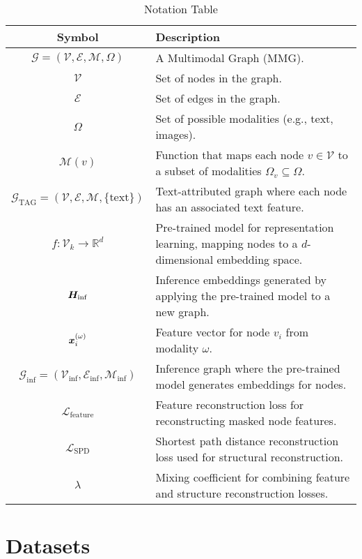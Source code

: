 \begin{table*}[t]
\centering
\caption{Notation Table}
\begin{tabular}{cl}
\toprule[1.1pt]
\textbf{Symbol} & \textbf{Description} \\ 
\midrule
$\mathcal{G} = (\mathcal{V}, \mathcal{E}, \mathcal{M}, \Omega)$ & A Multimodal Graph (MMG). \\ 
$\mathcal{V}$ & Set of nodes in the graph. \\ 
$\mathcal{E}$ & Set of edges in the graph. \\
$\Omega$ & Set of possible modalities (e.g., text, images). \\ 
$\mathcal{M}(v)$ & Function that maps each node $v \in \mathcal{V}$ to a subset of modalities $\Omega_v \subseteq \Omega$. \\ 
$\mathcal{G}_{\text{TAG}} = (\mathcal{V}, \mathcal{E}, \mathcal{M}, \{\text{text}\})$ & Text-attributed graph where each node has an associated text feature. \\ 
$f: \mathcal{V}_k \rightarrow \mathbb{R}^d$ & Pre-trained model for representation learning, mapping nodes to a $d$-dimensional embedding space. \\ 
${\bm{H}}_{\text{inf}}$ & Inference embeddings generated by applying the pre-trained model to a new graph. \\ 
${\bm{x}}^{(\omega)}_i$ & Feature vector for node $v_i$ from modality $\omega$. \\ 
$\mathcal{G}_{\text{inf}} = (\mathcal{V}_{\text{inf}}, \mathcal{E}_{\text{inf}}, \mathcal{M}_{\text{inf}})$ & Inference graph where the pre-trained model generates embeddings for nodes. \\ 
$\mathcal{L}_{\text{feature}}$ & Feature reconstruction loss for reconstructing masked node features. \\ 
$\mathcal{L}_{\text{SPD}}$ & Shortest path distance reconstruction loss used for structural reconstruction. \\ 
$\lambda$ & Mixing coefficient for combining feature and structure reconstruction losses. \\ 
\bottomrule[1.1pt]
\end{tabular}

\label{tab:preliminaries}
\end{table*}

\section{Datasets}

